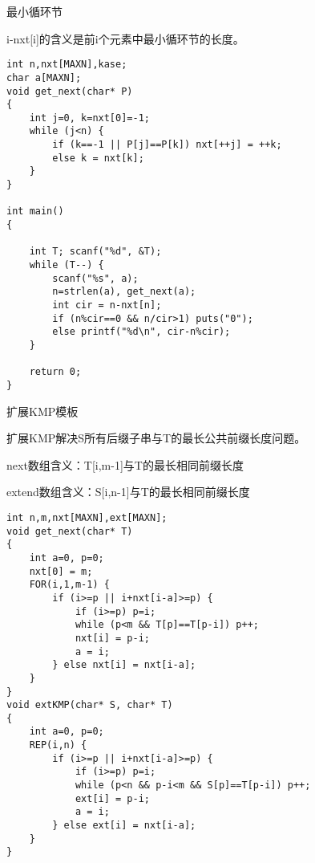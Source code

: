 最小循环节

i-nxt[i]的含义是前i个元素中最小循环节的长度。

\begin{lstlisting}
int n,nxt[MAXN],kase;
char a[MAXN];
void get_next(char* P)
{
    int j=0, k=nxt[0]=-1;
    while (j<n) {
        if (k==-1 || P[j]==P[k]) nxt[++j] = ++k;
        else k = nxt[k];
    }
}

int main()
{

    int T; scanf("%d", &T);
    while (T--) {
        scanf("%s", a);
        n=strlen(a), get_next(a);
        int cir = n-nxt[n];
        if (n%cir==0 && n/cir>1) puts("0");
        else printf("%d\n", cir-n%cir);
    }

    return 0;
}
\end{lstlisting}

扩展KMP模板

扩展KMP解决S所有后缀子串与T的最长公共前缀长度问题。

next数组含义：T[i,m-1]与T的最长相同前缀长度

extend数组含义：S[i,n-1]与T的最长相同前缀长度

\begin{lstlisting}
int n,m,nxt[MAXN],ext[MAXN];
void get_next(char* T)
{
    int a=0, p=0;
    nxt[0] = m;
    FOR(i,1,m-1) {
        if (i>=p || i+nxt[i-a]>=p) {
            if (i>=p) p=i;
            while (p<m && T[p]==T[p-i]) p++;
            nxt[i] = p-i;
            a = i;
        } else nxt[i] = nxt[i-a];
    }
}
void extKMP(char* S, char* T)
{
    int a=0, p=0;
    REP(i,n) {
        if (i>=p || i+nxt[i-a]>=p) {
            if (i>=p) p=i;
            while (p<n && p-i<m && S[p]==T[p-i]) p++;
            ext[i] = p-i;
            a = i;
        } else ext[i] = nxt[i-a];
    }
}
\end{lstlisting}